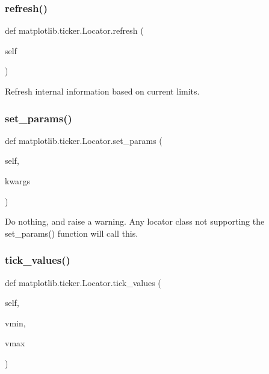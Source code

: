 \subsubsection{\texorpdfstring{refresh()}{refresh()}}
{\footnotesize\ttfamily def matplotlib.\+ticker.\+Locator.\+refresh (\begin{DoxyParamCaption}\item[{}]{self }\end{DoxyParamCaption})}

\begin{DoxyVerb}Refresh internal information based on current limits.\end{DoxyVerb}
 \mbox{\label{classmatplotlib_1_1ticker_1_1Locator_a25c3ebd1700f852dbc23f8d9c3962bf8}} 
\subsubsection{\texorpdfstring{set\+\_\+params()}{set\_params()}}
{\footnotesize\ttfamily def matplotlib.\+ticker.\+Locator.\+set\+\_\+params (\begin{DoxyParamCaption}\item[{}]{self,  }\item[{}]{kwargs }\end{DoxyParamCaption})}

\begin{DoxyVerb}Do nothing, and raise a warning. Any locator class not supporting the
set_params() function will call this.
\end{DoxyVerb}
 \mbox{\label{classmatplotlib_1_1ticker_1_1Locator_aa7ec417a277dde9f3892a7b951be2194}} 
\subsubsection{\texorpdfstring{tick\+\_\+values()}{tick\_values()}}
{\footnotesize\ttfamily def matplotlib.\+ticker.\+Locator.\+tick\+\_\+values (\begin{DoxyParamCaption}\item[{}]{self,  }\item[{}]{vmin,  }\item[{}]{vmax }\end{DoxyParamCaption})}

